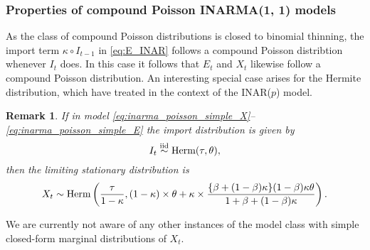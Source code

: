 \documentclass{article}
\newtheorem{remark}{Remark}
\begin{document}
\subsubsection{Properties of compound Poisson INARMA(1, 1) models}

As the class of compound Poisson distributions is closed to binomial thinning, the import term $\kappa \circ I_{t - 1}$ in \eqref{eq:E_INAR} follows a compound Poisson distribtion whenever $I_t$ does. In this case it follows that $E_t$ and $X_t$ likewise follow a compound Poisson distribution. An interesting special case arises for the Hermite distribution, which \cite{Fernandez-Fontelo2017} have treated in the context of the INAR($p$) model. %

\begin{remark}
If in model \eqref{eq:inarma_poisson_simple_X}--\eqref{eq:inarma_poisson_simple_E} the import distribution is given by
$$
I_t \stackrel{\textnormal{iid}}{\sim} \textnormal{Herm}(\tau, \theta),
$$
then the limiting stationary distribution is
$$
X_t \sim \textnormal{Herm}\left(\frac{\tau}{1 - \kappa},
(1 - \kappa)\times\theta + \kappa\times\frac{\{\beta + (1 - \beta)\kappa\}(1 - \beta)\kappa\theta}{1 + \beta + (1 - \beta)\kappa}
  \right).
$$
\end{remark}
We are currently not aware of any other instances of the model class with simple closed-form marginal distributions of $X_t$.
\end{document}
